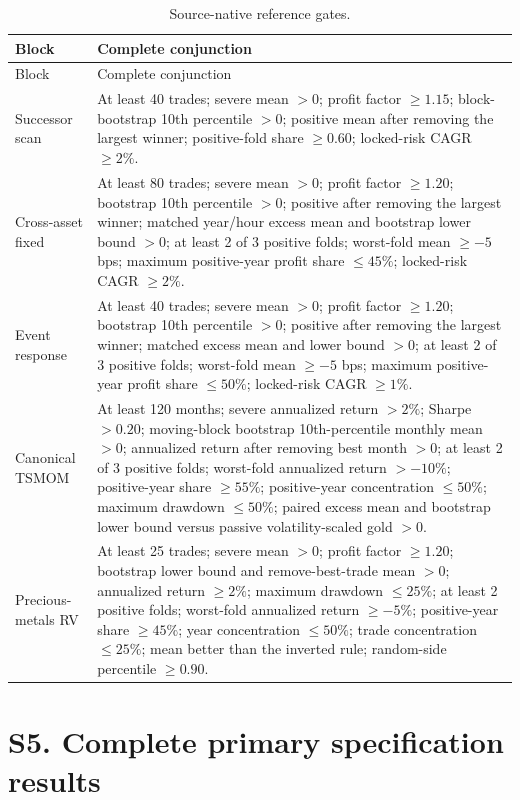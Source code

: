 \documentclass[a4paper,fleqn]{cas-sc}
\begin{document}
\begin{longtable}{P{2.4cm}P{10.7cm}}
\caption{Source-native reference gates.}\label{tab:s_gates}\\
\toprule Block & Complete conjunction \\
\midrule\endfirsthead
\toprule Block & Complete conjunction \\
\midrule\endhead
Successor scan & At least 40 trades; severe mean $>0$; profit factor $\ge1.15$; block-bootstrap 10th percentile $>0$; positive mean after removing the largest winner; positive-fold share $\ge0.60$; locked-risk CAGR $\ge2\%$. \\
Cross-asset fixed & At least 80 trades; severe mean $>0$; profit factor $\ge1.20$; bootstrap 10th percentile $>0$; positive after removing the largest winner; matched year/hour excess mean and bootstrap lower bound $>0$; at least 2 of 3 positive folds; worst-fold mean $\ge-5$ bps; maximum positive-year profit share $\le45\%$; locked-risk CAGR $\ge2\%$. \\
Event response & At least 40 trades; severe mean $>0$; profit factor $\ge1.20$; bootstrap 10th percentile $>0$; positive after removing the largest winner; matched excess mean and lower bound $>0$; at least 2 of 3 positive folds; worst-fold mean $\ge-5$ bps; maximum positive-year profit share $\le50\%$; locked-risk CAGR $\ge1\%$. \\
Canonical TSMOM & At least 120 months; severe annualized return $>2\%$; Sharpe $>0.20$; moving-block bootstrap 10th-percentile monthly mean $>0$; annualized return after removing best month $>0$; at least 2 of 3 positive folds; worst-fold annualized return $>-10\%$; positive-year share $\ge55\%$; positive-year concentration $\le50\%$; maximum drawdown $\le50\%$; paired excess mean and bootstrap lower bound versus passive volatility-scaled gold $>0$. \\
Precious-metals RV & At least 25 trades; severe mean $>0$; profit factor $\ge1.20$; bootstrap lower bound and remove-best-trade mean $>0$; annualized return $\ge2\%$; maximum drawdown $\le25\%$; at least 2 positive folds; worst-fold annualized return $\ge-5\%$; positive-year share $\ge45\%$; year concentration $\le50\%$; trade concentration $\le25\%$; mean better than the inverted rule; random-side percentile $\ge0.90$. \\
\bottomrule
\end{longtable}

\section*{S5. Complete primary specification results}
\end{document}
